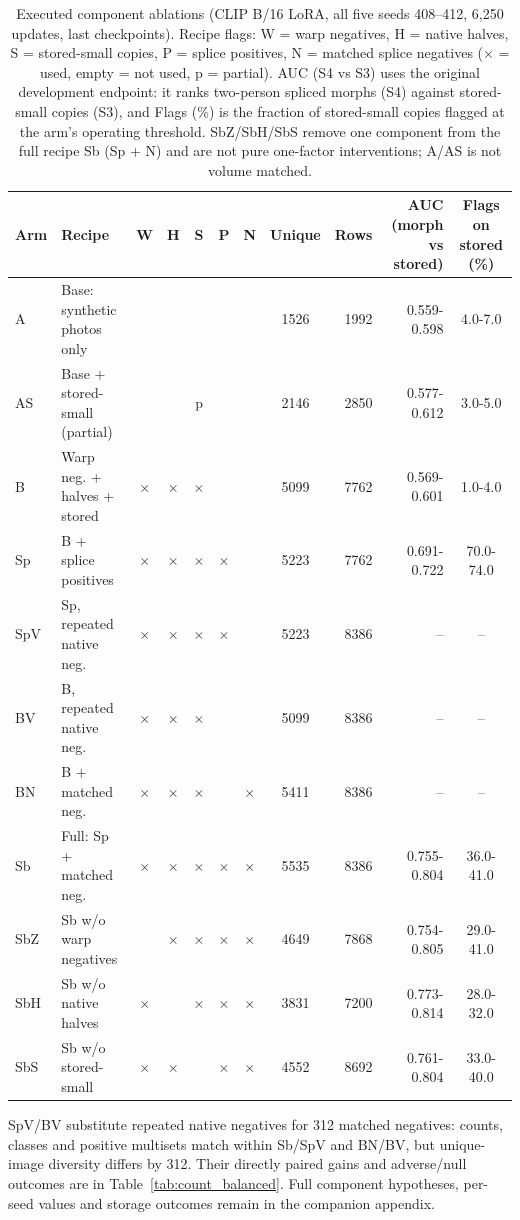 \documentclass[10pt,twocolumn,letterpaper]{article}
\begin{document}
    \begin{table}[t]
    \centering\small
    \caption{Executed component ablations (CLIP B/16 LoRA, all five seeds 408--412, 6,250 updates, last checkpoints). Recipe flags: W = warp negatives, H = native halves, S = stored-small copies, P = splice positives, N = matched splice negatives ($\times$ = used, empty = not used, p = partial). AUC (S4 vs S3) uses the original development endpoint: it ranks two-person spliced morphs (S4) against stored-small copies (S3), and Flags (\%) is the fraction of stored-small copies flagged at the arm's operating threshold. SbZ/SbH/SbS remove one component from the full recipe Sb (Sp + N) and are not pure one-factor interventions; A/AS is not volume matched.}
    \label{tab:executed_components}
    \begin{tabular}{llccccccrrc}
    \toprule
    Arm & Recipe & W & H & S & P & N & Unique & Rows & AUC (morph vs stored) & Flags on stored (\%) \\
    \midrule
    A & Base: synthetic photos only & & & & & & 1526 & 1992 & 0.559-0.598 & 4.0-7.0 \\
    AS & Base + stored-small (partial) & & & p & & & 2146 & 2850 & 0.577-0.612 & 3.0-5.0 \\
    B & Warp neg. + halves + stored & $\times$ & $\times$ & $\times$ & & & 5099 & 7762 & 0.569-0.601 & 1.0-4.0 \\
    Sp & B + splice positives & $\times$ & $\times$ & $\times$ & $\times$ & & 5223 & 7762 & 0.691-0.722 & 70.0-74.0 \\
    SpV & Sp, repeated native neg. & $\times$ & $\times$ & $\times$ & $\times$ & & 5223 & 8386 & -- & -- \\
    BV & B, repeated native neg. & $\times$ & $\times$ & $\times$ & & & 5099 & 8386 & -- & -- \\
    BN & B + matched neg. & $\times$ & $\times$ & $\times$ & & $\times$ & 5411 & 8386 & -- & -- \\
    Sb & Full: Sp + matched neg. & $\times$ & $\times$ & $\times$ & $\times$ & $\times$ & 5535 & 8386 & 0.755-0.804 & 36.0-41.0 \\
    SbZ & Sb w/o warp negatives & & $\times$ & $\times$ & $\times$ & $\times$ & 4649 & 7868 & 0.754-0.805 & 29.0-41.0 \\
    SbH & Sb w/o native halves & $\times$ & & $\times$ & $\times$ & $\times$ & 3831 & 7200 & 0.773-0.814 & 28.0-32.0 \\
    SbS & Sb w/o stored-small & $\times$ & $\times$ & & $\times$ & $\times$ & 4552 & 8692 & 0.761-0.804 & 33.0-40.0 \\
    \bottomrule
    \end{tabular}
    \par\smallskip\raggedright
    SpV/BV substitute repeated native negatives for 312 matched negatives: counts, classes and positive multisets match within Sb/SpV and BN/BV, but unique-image diversity differs by 312. Their directly paired gains and adverse/null outcomes are in Table~\ref{tab:count_balanced}. Full component hypotheses, per-seed values and storage outcomes remain in the companion appendix.
    \end{table}
\end{document}
